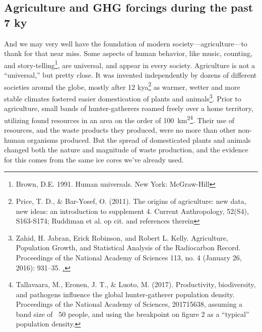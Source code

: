 \documentclass[amstex,12pt]{book}
\begin{document}
\subsection{Agriculture and GHG forcings during the past 7 ky}\label{Ag_GHG}
And we may very well have the foundation of modern society---agriculture---to thank for that near miss. Some aspects of human behavior, like music, counting, and story-telling\footnote{Brown, D.E. 1991. Human universals. New York: McGraw-Hill}, are universal, and appear in every society. Agriculture is not a ``universal,'' but pretty close. It was invented independently by dozens of different societies around the globe, mostly after 12 kya\footnote{Price, T. D., \& Bar-Yosef, O. (2011). The origins of agriculture: new data, new ideas: an introduction to supplement 4. Current Anthropology, 52(S4), S163-S174; Ruddiman et al. op cit. and references therein} as warmer, wetter and more stable climates fostered easier domestication of plants and animals\footnote{Zahid, H. Jabran, Erick Robinson, and Robert L. Kelly. Agriculture, Population Growth, and Statistical Analysis of the Radiocarbon Record. Proceedings of the National Academy of Sciences 113, no. 4 (January 26, 2016): 931–35. \href{https://doi.org/10.1073/pnas.1517650112}.}. Prior to agriculture, small bands of hunter-gatherers roamed freely over a home territory, utilizing found resources in an area on the order of \SI{100}{\square\kilo\metre}\footnote{Tallavaara, M., Eronen, J. T., \& Luoto, M. (2017). Productivity, biodiversity, and pathogens influence the global hunter-gatherer population density. Proceedings of the National Academy of Sciences, 201715638, assuming a band size of ~50 people, and using the breakpoint on figure 2 as a ``typical'' population density.}. Their use of resources, and the waste products they produced, were no more than other non-human organisms produced. But the spread of domesticated plants and animals changed both the nature and magnitude of waste production, and the evidence for this comes from the same ice cores we've already used.\\
\end{document}
